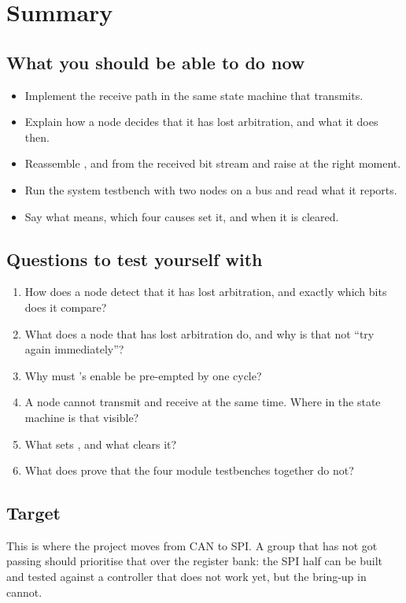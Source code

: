 
\section{Summary}
\label{c17:sec:review}

\subsection*{What you should be able to do now}
\begin{itemize}
  \item Implement the receive path in the same state machine that transmits.
  \item Explain how a node decides that it has lost arbitration, and what it does then.
  \item Reassemble ,  and  from the received bit stream and
    raise  at the right moment.
  \item Run the system testbench with two nodes on a bus and read what it reports.
  \item Say what  means, which four causes set it, and when it is cleared.
\end{itemize}

\subsection*{Questions to test yourself with}
\begin{enumerate}
  \item How does a node detect that it has lost arbitration, and exactly which bits does it compare?
  \item What does a node that has lost arbitration do, and why is that not ``try again
    immediately''?
  \item Why must 's enable be pre-empted by one cycle?
  \item A node cannot transmit and receive at the same time. Where in the state machine is that
    visible?
  \item What sets , and what clears it?
  \item What does  prove that the four module testbenches together do not?
\end{enumerate}

\subsection*{Target}
This is where the project moves from CAN to SPI. A group that has not got 
passing should prioritise that over the register bank: the SPI half can be built and tested against a
controller that does not work yet, but the bring-up in  cannot.

